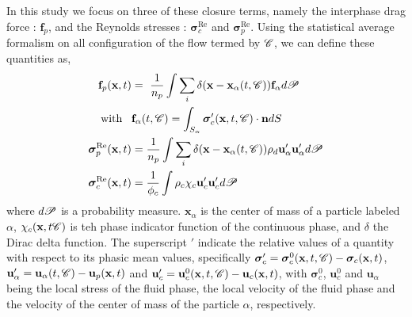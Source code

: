 In this study we focus on three of these closure terms, namely the interphase drag force : $\textbf{f}_p$, and the Reynolds stresses : $\bm{\sigma}^{\text{Re}}_c$ and $\bm{\sigma}^{\text{Re}}_p$. 
Using the statistical average formalism on all configuration of the flow termed by $\mathscr{C}$, we can define these quantities as,  
\begin{align}
    \textbf{f}_p (\textbf{x},t) &= \
    \frac{1}{n_p}\int \sum_i \delta(\textbf{x} - \textbf{x}_\alpha(t,\mathscr{C})) \textbf{f}_\alpha d\mathscr{P}\\
    \label{eq:f_alpha}
    \text{with} \;\;\; &\textbf{f}_\alpha(t,\mathscr{C}) = \int_{S_\alpha} \bm{\sigma}_c'(\textbf{x},t,\mathscr{C}) \cdot \textbf{n} dS \\
    \bm{\sigma}^{\text{Re}}_p(\textbf{x},t) &=\frac{1}{n_p} \int \sum_i \delta(\textbf{x} - \textbf{x}_\alpha(t,\mathscr{C})) \rho_d \textbf{u}_\alpha'\textbf{u}_\alpha' d\mathscr{P}\\
    \label{eq:def_uuc}
    \bm{\sigma}^{\text{Re}}_c(\textbf{x},t) &= \frac{1}{\phi_c}\int \rho_c\chi_c \textbf{u}_c' \textbf{u}_c'd\mathscr{P}
\end{align}
where $d\mathscr{P}$ is a probability measure. 
$\textbf{x}_\alpha$ is the center of mass of a particle labeled $\alpha$, $\chi_c(\textbf{x},t\mathscr{C})$ is teh phase indicator function of the continuous phase, and $\delta$ the Dirac delta function. 
The superscript $'$ indicate the relative values of a quantity with respect to its phasic mean values, specifically $\bm{\sigma}_c' = \bm{\sigma}_c^0(\textbf{x},t, \mathscr{C})  - \bm{\sigma}_c(\textbf{x},t)$, $\textbf{u}_\alpha' = \textbf{u}_\alpha(t,\mathscr{C}) - \textbf{u}_p(\textbf{x},t)$ and $\textbf{u}_c' = \textbf{u}_c^0(\textbf{x},t, \mathscr{C})  -\textbf{u}_c(\textbf{x},t)$, with $\bm{\sigma}_c^0 $, $\textbf{u}_c^0$ and $\textbf{u}_\alpha$ being the local stress of the fluid phase, the local velocity of the fluid phase and the velocity of the center of mass of the particle $\alpha$, respectively. 





